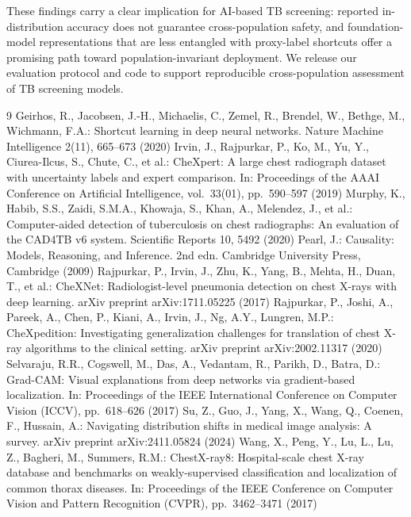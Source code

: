 \documentclass[runningheads]{llncs}
\begin{document}
These findings carry a clear implication for AI-based TB screening: reported in-distribution accuracy does not guarantee cross-population safety, and foundation-model representations that are less entangled with proxy-label shortcuts offer a promising path toward population-invariant deployment. We release our evaluation protocol and code to support reproducible cross-population assessment of TB screening models.

\begin{thebibliography}{9}
 Geirhos, R., Jacobsen, J.-H., Michaelis, C., Zemel, R., Brendel, W., Bethge, M., Wichmann, F.A.: Shortcut learning in deep neural networks. Nature Machine Intelligence 2(11), 665--673 (2020)
 Irvin, J., Rajpurkar, P., Ko, M., Yu, Y., Ciurea-Ilcus, S., Chute, C., et al.: CheXpert: A large chest radiograph dataset with uncertainty labels and expert comparison. In: Proceedings of the AAAI Conference on Artificial Intelligence, vol.~33(01), pp.~590--597 (2019)
 Murphy, K., Habib, S.S., Zaidi, S.M.A., Khowaja, S., Khan, A., Melendez, J., et al.: Computer-aided detection of tuberculosis on chest radiographs: An evaluation of the CAD4TB v6 system. Scientific Reports 10, 5492 (2020)
 Pearl, J.: Causality: Models, Reasoning, and Inference. 2nd edn. Cambridge University Press, Cambridge (2009)
 Rajpurkar, P., Irvin, J., Zhu, K., Yang, B., Mehta, H., Duan, T., et al.: CheXNet: Radiologist-level pneumonia detection on chest X-rays with deep learning. arXiv preprint arXiv:1711.05225 (2017)
 Rajpurkar, P., Joshi, A., Pareek, A., Chen, P., Kiani, A., Irvin, J., Ng, A.Y., Lungren, M.P.: CheXpedition: Investigating generalization challenges for translation of chest X-ray algorithms to the clinical setting. arXiv preprint arXiv:2002.11317 (2020)
 Selvaraju, R.R., Cogswell, M., Das, A., Vedantam, R., Parikh, D., Batra, D.: Grad-CAM: Visual explanations from deep networks via gradient-based localization. In: Proceedings of the IEEE International Conference on Computer Vision (ICCV), pp.~618--626 (2017)
 Su, Z., Guo, J., Yang, X., Wang, Q., Coenen, F., Hussain, A.: Navigating distribution shifts in medical image analysis: A survey. arXiv preprint arXiv:2411.05824 (2024)
 Wang, X., Peng, Y., Lu, L., Lu, Z., Bagheri, M., Summers, R.M.: ChestX-ray8: Hospital-scale chest X-ray database and benchmarks on weakly-supervised classification and localization of common thorax diseases. In: Proceedings of the IEEE Conference on Computer Vision and Pattern Recognition (CVPR), pp.~3462--3471 (2017)

\end{thebibliography}
\end{document}
